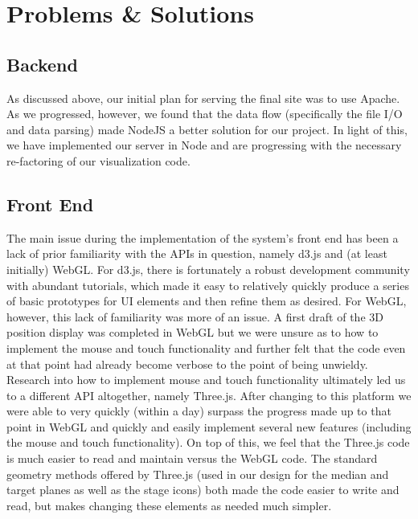 \documentclass[journal,10pt,onecolumn,compsoc]{IEEEtran}
\begin{document}

\section{Problems \& Solutions}

	\subsection{Backend}
	
		As discussed above, our initial plan for serving the final site was to use Apache.
    As we progressed, however, we found that the data flow (specifically the file I/O and data parsing) made NodeJS a better solution for our project.
    In light of this, we have implemented our server in Node and are progressing with the necessary re-factoring of our visualization code.
	
	\subsection{Front End}
		The main issue during the implementation of the system's front end has been a lack of prior familiarity with the APIs in question, namely d3.js and (at least initially) WebGL.
		For d3.js, there is fortunately a robust development community with abundant tutorials, which made it easy to relatively quickly produce a series of basic prototypes for UI elements and then refine them as desired.
		For WebGL, however, this lack of familiarity was more of an issue.
		A first draft of the 3D position display was completed in WebGL but we were unsure as to how to implement the mouse and touch functionality and further felt that the code even at that point had already become verbose to the point of being unwieldy.
		Research into how to implement mouse and touch functionality ultimately led us to a different API altogether, namely Three.js.
		After changing to this platform we were able to very quickly (within a day) surpass the progress made up to that point in WebGL and quickly and easily implement several new features (including the mouse and touch functionality).
		On top of this, we feel that the Three.js code is much easier to read and maintain versus the WebGL code.
		The standard geometry methods offered by Three.js (used in our design for the median and target planes as well as the stage icons) both made the code easier to write and read, but makes changing these elements as needed much simpler.		
\newpage
\end{document}
